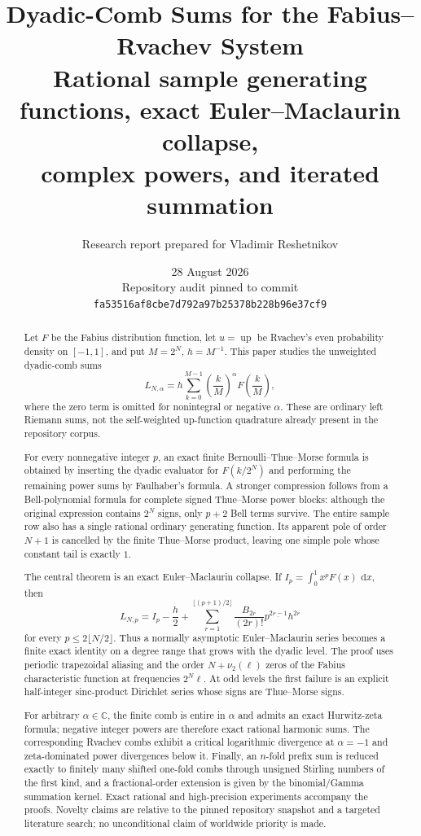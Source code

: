 \documentclass[11pt,oneside]{article}
\title{\bfseries Dyadic-Comb Sums for the Fabius--Rvachev System\\[0.35em]
\Large Rational sample generating functions, exact Euler--Maclaurin collapse,\\
complex powers, and iterated summation}
\author{Research report prepared for Vladimir Reshetnikov}
\date{28 August 2026\\[0.25em]
\small Repository audit pinned to commit \texttt{fa53516af8cbe7d792a97b25378b228b96e37cf9}}
\numberwithin{equation}{section}
\theoremstyle{definition}
\theoremstyle{remark}
\newcommand{\C}{\mathbb C}
\newcommand{\dd}{\,\mathrm d}
\newcommand{\Up}{\operatorname{up}}
\newcommand{\fall}[2]{#1^{\underline{#2}}}
\begin{document}
\maketitle

\begin{abstract}
Let \(F\) be the Fabius distribution function, let \(u=\Up\) be Rvachev's even
probability density on \([-1,1]\), and put \(M=2^N\), \(h=M^{-1}\).  This paper
studies the unweighted dyadic-comb sums
\[
 L_{N,\alpha}=h\sum_{k=0}^{M-1}\left(\frac{k}{M}\right)^{\alpha}
 F\!\left(\frac{k}{M}\right),
\]
where the zero term is omitted for nonintegral or negative \(\alpha\).  These are ordinary
left Riemann sums, not the self-weighted up-function quadrature already present in the
repository corpus.

For every nonnegative integer \(p\), an exact finite Bernoulli--Thue--Morse formula is
obtained by inserting the dyadic evaluator for \(F(k/2^N)\) and performing the remaining
power sums by Faulhaber's formula.  A stronger compression follows from a Bell-polynomial
formula for complete signed Thue--Morse power blocks: although the original expression
contains \(2^N\) signs, only \(p+2\) Bell terms survive.  The entire sample row also has a
single rational ordinary generating function.  Its apparent pole of order \(N+1\) is
cancelled by the finite Thue--Morse product, leaving one simple pole whose constant tail is
exactly \(1\).

The central theorem is an exact Euler--Maclaurin collapse.  If
\(I_p=\int_0^1x^pF(x)\,\dd x\), then
\[
 L_{N,p}=I_p-\frac h2+
 \sum_{r=1}^{\lfloor(p+1)/2\rfloor}
 \frac{B_{2r}}{(2r)!}\fall p{2r-1}h^{2r}
\]
for every \(p\le 2\lfloor N/2\rfloor\).  Thus a normally asymptotic
Euler--Maclaurin series becomes a finite exact identity on a degree range that grows with
the dyadic level.  The proof uses periodic trapezoidal aliasing and the order
\(N+\nu_2(\ell)\) zeros of the Fabius characteristic function at frequencies
\(2^N\ell\).  At odd levels the first failure is an explicit half-integer sinc-product
Dirichlet series whose signs are Thue--Morse signs.

For arbitrary \(\alpha\in\C\), the finite comb is entire in \(\alpha\) and admits an
exact Hurwitz-zeta formula; negative integer powers are therefore exact rational harmonic
sums.  The corresponding Rvachev combs exhibit a critical logarithmic divergence at
\(\alpha=-1\) and zeta-dominated power divergences below it.  Finally, an \(n\)-fold
prefix sum is reduced exactly to finitely many shifted one-fold combs through unsigned
Stirling numbers of the first kind, and a fractional-order extension is given by the
binomial/Gamma summation kernel.  Exact rational and high-precision experiments accompany
the proofs.  Novelty claims are relative to the pinned repository snapshot and a targeted
literature search; no unconditional claim of worldwide priority is made.
\end{abstract}
\end{document}
